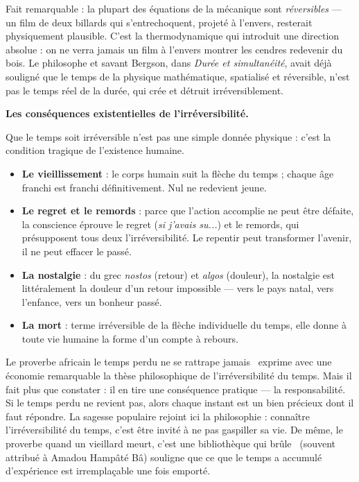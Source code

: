\documentclass[11pt]{article}
\begin{document}
\begin{savaistu}
Fait remarquable : la plupart des équations de la mécanique sont \emph{réversibles} — un film de deux billards qui s'entrechoquent, projeté à l'envers, resterait physiquement plausible. C'est la thermodynamique qui introduit une direction absolue : on ne verra jamais un film à l'envers montrer les cendres redevenir du bois. Le philosophe et savant Bergson, dans \emph{Durée et simultanéité}, avait déjà souligné que le temps de la physique mathématique, spatialisé et réversible, n'est pas le temps réel de la durée, qui crée et détruit irréversiblement.
\end{savaistu}

\textbf{Les conséquences existentielles de l'irréversibilité.}\par
Que le temps soit irréversible n'est pas une simple donnée physique : c'est la condition tragique de l'existence humaine.

\begin{itemize}
\item \textbf{Le vieillissement} : le corps humain suit la flèche du temps ; chaque âge franchi est franchi définitivement. Nul ne redevient jeune.
\item \textbf{Le regret et le remords} : parce que l'action accomplie ne peut être défaite, la conscience éprouve le regret (\emph{si j'avais su...}) et le remords, qui présupposent tous deux l'irréversibilité. Le repentir peut transformer l'avenir, il ne peut effacer le passé.
\item \textbf{La nostalgie} : du grec \emph{nostos} (retour) et \emph{algos} (douleur), la nostalgie est littéralement la douleur d'un retour impossible — vers le pays natal, vers l'enfance, vers un bonheur passé.
\item \textbf{La mort} : terme irréversible de la flèche individuelle du temps, elle donne à toute vie humaine la forme d'un compte à rebours.
\end{itemize}

\begin{exemplebox}
Le proverbe africain \guillemotleft le temps perdu ne se rattrape jamais \guillemotright\ exprime avec une économie remarquable la thèse philosophique de l'irréversibilité du temps. Mais il fait plus que constater : il en tire une conséquence pratique — la responsabilité. Si le temps perdu ne revient pas, alors chaque instant est un bien précieux dont il faut répondre. La sagesse populaire rejoint ici la philosophie : connaître l'irréversibilité du temps, c'est être invité à ne pas gaspiller sa vie. De même, le proverbe \guillemotleft quand un vieillard meurt, c'est une bibliothèque qui brûle \guillemotright\ (souvent attribué à Amadou Hampâté Bâ) souligne que ce que le temps a accumulé d'expérience est irremplaçable une fois emporté.
\end{exemplebox}
\end{document}

